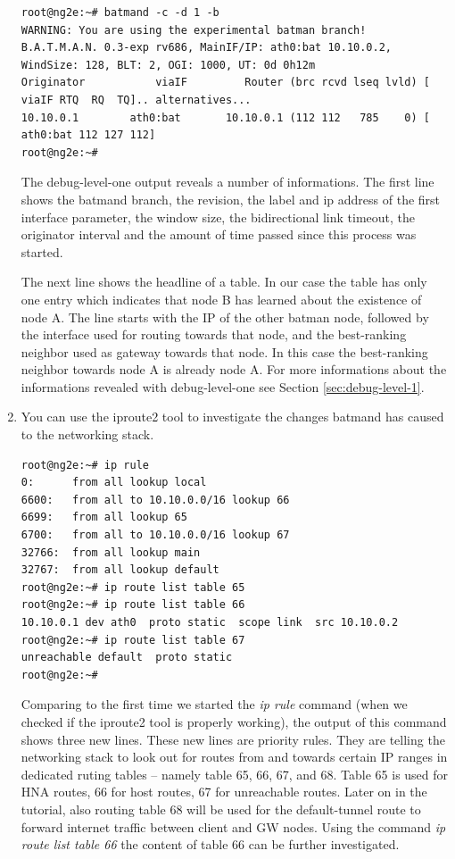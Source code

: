 \documentclass[11pt]{article}
\begin{document}
\begin{enumerate}
\begin{small} \begin{verbatim}
root@ng2e:~# batmand -c -d 1 -b
WARNING: You are using the experimental batman branch!
B.A.T.M.A.N. 0.3-exp rv686, MainIF/IP: ath0:bat 10.10.0.2, WindSize: 128, BLT: 2, OGI: 1000, UT: 0d 0h12m
Originator           viaIF         Router (brc rcvd lseq lvld) [    viaIF RTQ  RQ  TQ].. alternatives...
10.10.0.1        ath0:bat       10.10.0.1 (112 112   785    0) [ ath0:bat 112 127 112]
root@ng2e:~#
\end{verbatim} \end{small}

The debug-level-one output reveals a number of informations. The first line shows the batmand branch, the revision, the label and ip address of the first interface parameter, the window size, the bidirectional link timeout, the originator interval and the amount of time passed since this process was started. 

The next line shows the headline of a table. 
In our case the table has only one entry which indicates that node B has learned about the existence of node A.
The line starts with the IP of the other batman node, followed by the interface used for routing towards that node, and the best-ranking neighbor used as gateway towards that node. In this case the best-ranking neighbor towards node A is already node A.
For more informations about the informations revealed with debug-level-one see Section \ref{sec:debug-level-1}.

\item You can use the iproute2 tool to investigate the changes batmand has caused to the networking stack.

\begin{small} \begin{verbatim}
root@ng2e:~# ip rule
0:      from all lookup local
6600:   from all to 10.10.0.0/16 lookup 66
6699:   from all lookup 65
6700:   from all to 10.10.0.0/16 lookup 67
32766:  from all lookup main
32767:  from all lookup default
root@ng2e:~# ip route list table 65
root@ng2e:~# ip route list table 66
10.10.0.1 dev ath0  proto static  scope link  src 10.10.0.2
root@ng2e:~# ip route list table 67
unreachable default  proto static
root@ng2e:~#
\end{verbatim} \end{small}

Comparing to the first time we started the \emph{ip rule} command (when we checked if the iproute2 tool is properly working), the output of this command shows three new lines. 
These new lines are priority rules. 
They are telling the networking stack to look out for routes from and towards certain IP ranges in dedicated ruting tables -- namely table 65, 66, 67, and 68. 
%
Table 65 is used for HNA routes, 66 for host routes, 67 for unreachable routes.
Later on in the tutorial, also routing table 68 will be used for the default-tunnel route to forward internet traffic between client and GW nodes.
%
Using the command \emph{ip route list table 66} the content of table 66 can be further investigated. 


\end{enumerate}
\end{document}
